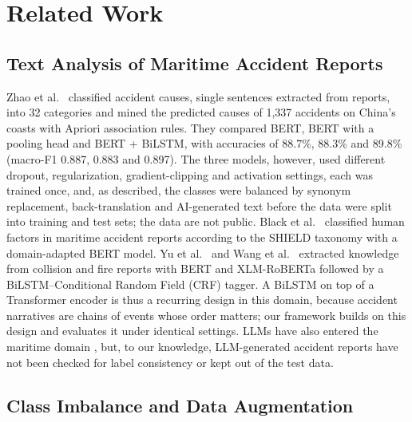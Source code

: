 \documentclass[conference]{IEEEtran}
\begin{document}
\section{Related Work}\label{sec:lit}

\subsection{Text Analysis of Maritime Accident Reports}

Zhao et al.\ \cite{zhao2025causation} classified accident causes, single sentences extracted from reports, into 32 categories and mined the predicted causes of 1,337 accidents on China's coasts with Apriori association rules. They compared BERT, BERT with a pooling head and BERT + BiLSTM, with accuracies of 88.7\%, 88.3\% and 89.8\% (macro-F1 0.887, 0.883 and 0.897). The three models, however, used different dropout, regularization, gradient-clipping and activation settings, each was trained once, and, as described, the classes were balanced by synonym replacement, back-translation and AI-generated text before the data were split into training and test sets; the data are not public. Black et al.\ \cite{black2026domain} classified human factors in maritime accident reports according to the SHIELD taxonomy with a domain-adapted BERT model. Yu et al.\ \cite{yu2026semantic} and Wang et al.\ \cite{wang2026fire} extracted knowledge from collision and fire reports with BERT and XLM-RoBERTa followed by a BiLSTM--Conditional Random Field (CRF) tagger. A BiLSTM on top of a Transformer encoder is thus a recurring design in this domain, because accident narratives are chains of events whose order matters; our framework builds on this design and evaluates it under identical settings. LLMs have also entered the maritime domain \cite{nguyen2025llamarine,park2025aisllm}, but, to our knowledge, LLM-generated accident reports have not been checked for label consistency or kept out of the test data.

\subsection{Class Imbalance and Data Augmentation}
\end{document}
